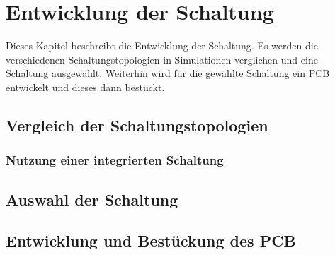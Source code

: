 \chapter{Entwicklung der Schaltung}
Dieses Kapitel beschreibt die Entwicklung der Schaltung.
Es werden die verschiedenen Schaltungstopologien in Simulationen 
verglichen und eine Schaltung ausgewählt.
Weiterhin wird für die gewählte Schaltung ein PCB entwickelt und dieses dann
bestückt.

\section{Vergleich der Schaltungstopologien}
\subsection{Nutzung einer integrierten Schaltung}
\section{Auswahl der Schaltung}
\section{Entwicklung und Bestückung des PCB}